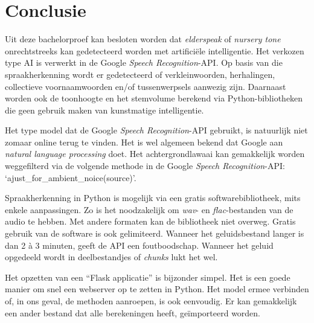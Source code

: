 
\chapter{Conclusie}
\label{ch:conclusie}


Uit deze bachelorproef kan besloten worden dat \textit{elderspeak} of \textit{nursery tone} onrechtstreeks kan gedetecteerd worden met artificiële intelligentie. Het verkozen type AI is verwerkt in de Google \textit{Speech Recognition}-API. Op basis van die spraakherkenning wordt er gedetecteerd of verkleinwoorden, herhalingen, collectieve voornaamwoorden en/of tussenwerpsels aanwezig zijn. Daarnaast worden ook de toonhoogte en het stemvolume berekend via Python-bibliotheken die geen gebruik maken van kunstmatige intelligentie.

Het type model dat de Google \textit{Speech Recognition}-API gebruikt, is natuurlijk niet zomaar online terug te vinden. Het is wel algemeen bekend dat Google aan \textit{natural language processing} doet.
Het achtergrondlawaai kan gemakkelijk worden weggefilterd via de volgende methode in de Google \textit{Speech Recognition}-API: `ajust\_for\_ambient\_noice(source)'.

Spraakherkenning in Python is mogelijk via een gratis softwarebibliotheek, mits enkele aanpassingen. Zo is het noodzakelijk om \textit{wav}- en \textit{flac}-bestanden van de audio te hebben. Met andere formaten kan de bibliotheek niet overweg. Gratis gebruik van de software is ook gelimiteerd. Wanneer het geluidsbestand langer is dan 2 à 3 minuten, geeft de API een foutboodschap. Wanneer het geluid opgedeeld wordt in deelbestandjes of \textit{chunks} lukt het wel.

Het opzetten van een ``Flask applicatie'' is bijzonder simpel. Het is een goede manier om snel een webserver op te zetten in Python. Het model ermee verbinden of, in ons geval, de methoden aanroepen, is ook eenvoudig. Er kan gemakkelijk een ander bestand dat alle berekeningen heeft, geïmporteerd worden.

